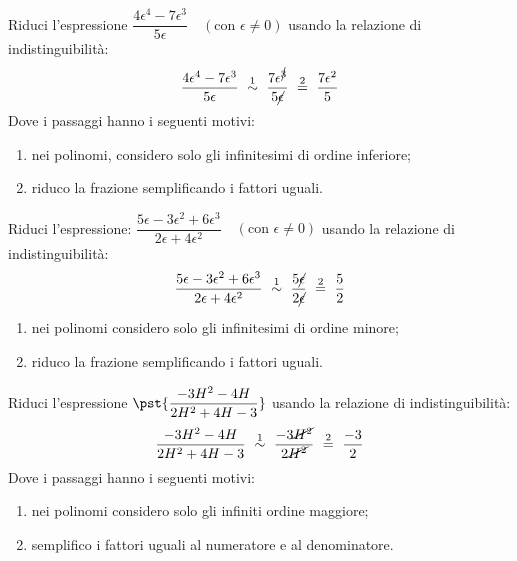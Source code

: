 \begin{esempio}
Riduci l'espressione \quad 
\(\dfrac{4 \epsilon^4 -7 \epsilon^3}{5 \epsilon} \quad (\text{con }\epsilon \ne 0)                    
\)
usando la relazione di indistinguibilità:
\[\dfrac{4 \epsilon^4 -7 \epsilon^3}{5 \epsilon} 
~ \stackrel{1}{\sim} ~
  \dfrac{7\epsilon^{\cancel{3}}}{5 \cancel{\epsilon}} 
~ \stackrel{2}{=} ~
  \dfrac{7\epsilon^2}{5}\]
Dove i passaggi hanno i seguenti motivi:
\begin{enumerate} [nosep]
 \item nei polinomi, considero solo gli infinitesimi di ordine inferiore; 
 \item riduco la frazione semplificando i fattori uguali.
\end{enumerate}
\end{esempio}

\begin{esempio}
Riduci l'espressione: \quad
\(\dfrac{5\epsilon -3 \epsilon^2 + 6 \epsilon^3}
         {2\epsilon + 4 \epsilon^2}\quad (\text{con }\epsilon \ne 0)\)
usando la relazione di indistinguibilità: 
\[\dfrac{5\epsilon -3 \epsilon^2 + 6 \epsilon^3}
         {2\epsilon + 4 \epsilon^2} 
~ \stackrel{1}{\sim} ~
  \dfrac{5 \cancel{\epsilon}}{2 \cancel{\epsilon}} 
~ \stackrel{2}{=} ~
  \dfrac{5}{2}\]
\begin{enumerate} [nosep]
 \item nei polinomi considero solo gli infinitesimi di ordine minore;
 \item riduco la frazione semplificando i fattori uguali.
\end{enumerate}
\end{esempio}

\begin{esempio}
Riduci l'espressione 
\(\pst{\dfrac{-3H^2 -4H}{2H^2 +4H -3}}\)
usando la relazione di indistinguibilità: 
\[\dfrac{-3H^2 -4H}{2H^2 +4H -3} 
~ \stackrel{1}{\sim} ~
  \dfrac{-3\cancel{H^2}}{2\cancel{H^2}} 
~ \stackrel{2}{=} ~
  \dfrac{-3}{2}\]
Dove i passaggi hanno i seguenti motivi:
\begin{enumerate} [nosep]
 \item nei polinomi considero solo gli infiniti ordine maggiore; 
 \item semplifico i fattori uguali al numeratore e al denominatore.
\end{enumerate}
\end{esempio}

